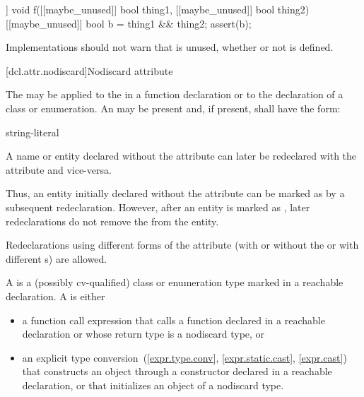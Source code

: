 \pnum
\begin{example}
\begin{codeblock}
[[maybe_unused]] void f([[maybe_unused]] bool thing1,
                        [[maybe_unused]] bool thing2) {
  [[maybe_unused]] bool b = thing1 && thing2;
  assert(b);
}
\end{codeblock}
Implementations should not warn that  is unused,
whether or not  is defined.
\end{example}

[dcl.attr.nodiscard]{Nodiscard attribute}%

\pnum
The  
may be applied to the 
in a function declaration or to the declaration of a class or enumeration.
An  may be present
and, if present, shall have the form:
\begin{ncbnf}
\terminal{(} string-literal \terminal{)}
\end{ncbnf}

\pnum
A name or entity declared without the  attribute
can later be redeclared with the attribute and vice-versa.
\begin{note}
Thus, an entity initially declared without the attribute
can be marked as 
by a subsequent redeclaration.
However, after an entity is marked as ,
later redeclarations do not remove the 
from the entity.
\end{note}
Redeclarations using different forms of the attribute
(with or without the 
or with different s)
are allowed.

\pnum
A  is
a (possibly cv-qualified) class or enumeration type
marked  in a reachable declaration.
A  is either
\begin{itemize}
\item
  a function call expression
  that calls a function declared  in a reachable declaration or
  whose return type is a nodiscard type, or
\item
  an explicit type
  conversion~(\ref{expr.type.conv}, \ref{expr.static.cast}, \ref{expr.cast})
  that constructs an object through
  a constructor declared  in a reachable declaration, or
  that initializes an object of a nodiscard type.
\end{itemize}

